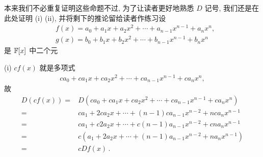 \begin{pf}
    本来我们不必重复证明这些命题\period 不过, 为了让读者更好地熟悉 $D$ 记号, 我们还是在此处证明 (i) (ii), 并将剩下的推论留给读者作练习\period 设
    \begin{align*}
         & f(x) = a_0 + a_1 x + a_2 x^2 + \cdots + a_{n-1} x^{n-1} + a_n x^n, \\
         & g(x) = b_0 + b_1 x + b_2 x^2 + \cdots + b_{n-1} x^{n-1} + b_n x^n
    \end{align*}
    是 $\mathbb{F}[x]$ 中二个元\period

    (i) $cf(x)$ 就是多项式
    \begin{align*}
        ca_0 + ca_1 x + ca_2 x^2 + \cdots + ca_{n-1} x^{n-1} + ca_n x^n,
    \end{align*}
    故
    \begin{align*}
        D(cf(x))
        = {} & D(ca_0 + ca_1 x + ca_2 x^2 + \cdots + ca_{n-1} x^{n-1} + ca_n x^n) \\
        = {} & ca_1 + 2ca_2 x + \cdots + (n-1)ca_{n-1} x^{n-2} + nca_n x^{n-1}    \\
        = {} & ca_1 + c2a_2 x + \cdots + c(n-1)a_{n-1} x^{n-2} + cna_n x^{n-1}    \\
        = {} & c(a_1 + 2a_2 x + \cdots + (n-1)a_{n-1} x^{n-2} + na_n x^{n-1})     \\
        = {} & cDf(x) \period
    \end{align*}


\end{pf}
